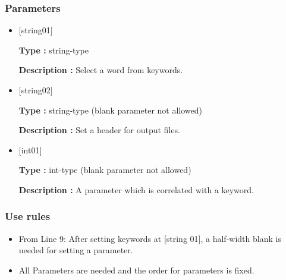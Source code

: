 \subsubsection{Parameters}
\begin{itemize}
   \item  $[$string01$]$
   
   {\bf Type :} string-type

  {\bf Description :} Select a word from keywords.
   
   \item  $[$string02$]$
   
   {\bf Type :} string-type (blank parameter not allowed)

  {\bf Description :} Set a header for output files.

   \item  $[$int01$]$
   
   {\bf Type :} int-type (blank parameter not allowed)

  {\bf Description :} A parameter which is correlated with a keyword.
  \end{itemize}

\subsubsection{Use rules}
\begin{itemize}
\item From Line 9: After setting keywords at [string 01], a half-width blank is needed for setting a parameter.
\item All Parameters are needed and the order for parameters is fixed.
\end{itemize}

